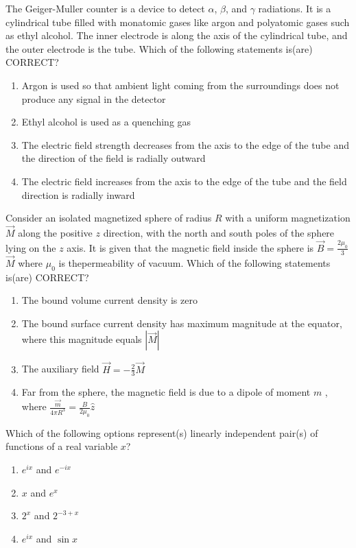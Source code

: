 \item The Geiger-Muller counter is a device to detect $\alpha$, $\beta$, and $\gamma$ radiations. It is a cylindrical tube filled with monatomic gases like argon and polyatomic gases such as ethyl alcohol. The inner electrode is along the axis of the cylindrical tube, and the outer electrode is the tube. Which of the following statements is(are) CORRECT?
\begin{enumerate}
\item Argon is used so that ambient light coming from the surroundings does not produce any signal in the detector
\item Ethyl alcohol is used as a quenching gas
\item The electric field strength decreases from the axis to the edge of the tube and the direction of the field is radially outward
\item The electric field increases from the axis to the edge of the tube and the field direction is radially inward
\end{enumerate}


\item Consider an isolated magnetized sphere of radius $R$ with a uniform magnetization $\vec{M}$ along the positive $z$ direction, with the north and south poles of the sphere lying on the $z$ axis. It is given that the magnetic field inside the sphere is $\vec{B} = \frac{2\mu_{0}}{3}$ $\vec{M}$ where $\mu_{0}$ is thepermeability of vacuum. Which of the following statements is(are) CORRECT?

\begin{enumerate}
\item The bound volume current density is zero
\item The bound surface current density has maximum magnitude at the equator, where this magnitude equals $|\overrightarrow{M}|$
\item The auxiliary field $\vec{H} = -\frac{2}{3} \vec{M}$
\item Far from the sphere, the magnetic field is due to a dipole of moment $m$ , where $\frac{\vec{m}}{4\pi R^3} =\frac{B}{2\mu_{0}} \hat{z}$
\end{enumerate}


\item Which of the following options represent(s) linearly independent pair(s) of functions of a real variable $x$?

\begin{enumerate}
    \item $e^{ix}$ and $e^{-ix}$
    \item  $x$ and $e^{x}$
    \item $2^{x}$ and $2^{- 3 + x}$
    \item $e^{ix}$ and $\sin x$
\end{enumerate}

